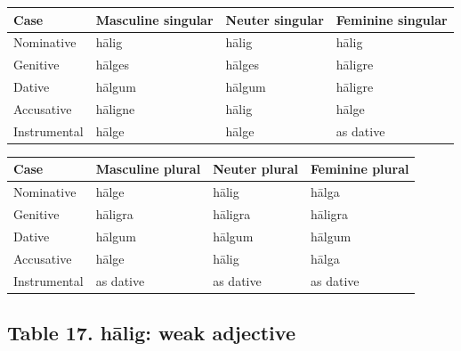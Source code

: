 \par\begingroup
\fontsize{10.5}{13.2}\selectfont
\setlength{\LTleft}{0pt}\setlength{\LTright}{\fill}
\noindent
\begin{tabular}{@{}>{\raggedright\arraybackslash}p{22.0mm}>{\raggedright\arraybackslash}p{31.188mm}>{\raggedright\arraybackslash}p{31.188mm}>{\raggedright\arraybackslash}p{31.188mm}@{}}
\toprule
\textbf{Case} & \textbf{Masculine singular} & \textbf{Neuter singular} & \textbf{Feminine singular} \\
\midrule
Nominative & hālig & hālig & hālig \\
Genitive & hālges & hālges & hāligre \\
Dative & hālgum & hālgum & hāligre \\
Accusative & hāligne & hālig & hālge \\
Instrumental & hālge & hālge & as dative \\
\bottomrule
\end{tabular}
\par\endgroup
\par\addvspace{5pt}
\par\begingroup
\fontsize{10.5}{13.2}\selectfont
\setlength{\LTleft}{0pt}\setlength{\LTright}{\fill}
\noindent
\begin{tabular}{@{}>{\raggedright\arraybackslash}p{22.0mm}>{\raggedright\arraybackslash}p{31.188mm}>{\raggedright\arraybackslash}p{31.188mm}>{\raggedright\arraybackslash}p{31.188mm}@{}}
\toprule
\textbf{Case} & \textbf{Masculine plural} & \textbf{Neuter plural} & \textbf{Feminine plural} \\
\midrule
Nominative & hālge & hālig & hālga \\
Genitive & hāligra & hāligra & hāligra \\
Dative & hālgum & hālgum & hālgum \\
Accusative & hālge & hālig & hālga \\
Instrumental & as dative & as dative & as dative \\
\bottomrule
\end{tabular}
\par\endgroup

\subsection*{Table 17. hālig: weak adjective}

